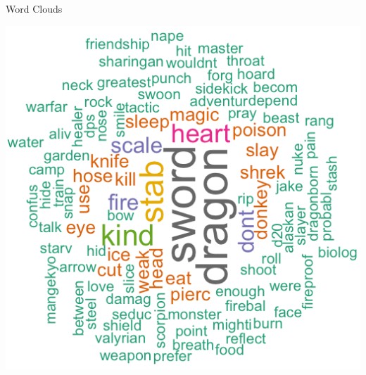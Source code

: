 \begin{frame}{Word Clouds}
    \begin{center}
        \includegraphics[scale=0.4]{images/dragonCloud.png}
    \end{center}
\end{frame}

